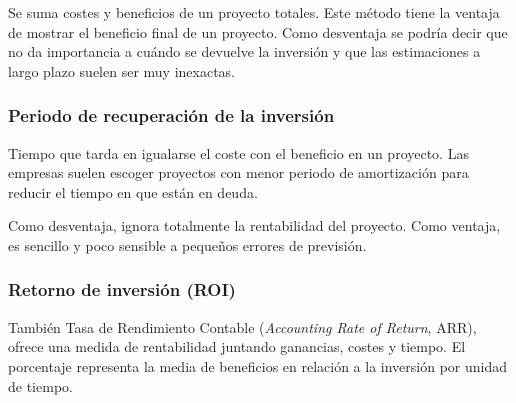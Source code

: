 \documentclass[12pt]{article}
\begin{document}
{Se suma costes y beneficios de un proyecto totales. Este método tiene la ventaja de mostrar el beneficio final de un proyecto. Como desventaja se podría decir que no da importancia a cuándo se devuelve la inversión y que las estimaciones a largo plazo suelen ser muy inexactas.}

\begin{table}[ht]
\centering
{}
\caption{Beneficios Netos}
\label{tab:2.1}
\end{table}

\subsubsection{Periodo de recuperación de la inversión}
\label{2.5.2}

{Tiempo que tarda en igualarse el coste con el beneficio en un proyecto. Las empresas suelen escoger proyectos con menor periodo de amortización para reducir el tiempo en que están en deuda.} \bigskip

{Como desventaja, ignora totalmente la rentabilidad del proyecto. Como ventaja, es sencillo y poco sensible a pequeños errores de previsión.}

\subsubsection{Retorno de inversión (ROI)}
\label{2.5.3}

{También Tasa de Rendimiento Contable (\textit{Accounting Rate of Return}, ARR), ofrece una medida de rentabilidad juntando ganancias, costes y tiempo. El porcentaje representa la media de beneficios en relación a la inversión por unidad de tiempo.}
\end{document}
